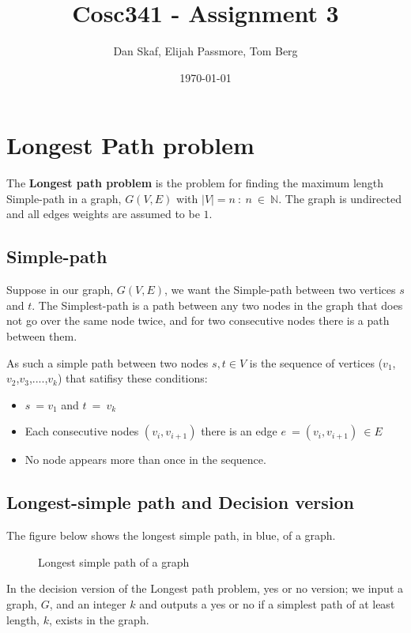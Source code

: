 \documentclass[a4paper,11pt]{article}
\title{Cosc341 - Assignment 3}
\author{Dan Skaf, Elijah Passmore, Tom Berg}
\date{\today}
\begin{document}
\maketitle

\section{Longest Path problem}
The \textbf{Longest path problem} is the problem for finding the maximum length 
Simple-path in a graph, $G(V,E)$ with $\left|V\right|=n\::\:n\:\in\:\mathbb{N}$.
The graph is undirected and all edges weights are assumed to be $1$.

    \subsection{Simple-path} 
    Suppose in our graph, $G(V,E)$, we want the Simple-path between two vertices 
    $s$ and $t$. The Simplest-path is a path between any two nodes in the graph 
    that does not go over the same node twice, and for two consecutive nodes 
    there is a path between them.

    As such a simple path between two nodes $s,t\in V$ is the sequence of 
    vertices ($v_1$,$v_2$,$v_3$,$....$,$v_k$) that satifisy these conditions:
    \begin{itemize}
        \item $s\:=v_1$ and $t\:=\:v_k$
        \item Each consecutive nodes $\left(v_i,v_{i+1}\right)$ there is an 
        edge $e\:=\left(v_i,v_{i+1}\right)\:\in E$
        \item No node appears more than once in the sequence.
    \end{itemize}

    \subsection{Longest-simple path and Decision version}
    The figure below shows the longest simple path, in blue, of a graph.
    \begin{figure}[!h]
        \centering {}
        \caption{Longest simple path of a graph}
    \end{figure}

    In the decision version of the Longest path problem, yes or no version; 
    we input a graph, $G$, and an integer $k$ and outputs a yes or no if a 
    simplest path of at least length, $k$, exists in the graph.
\end{document}
